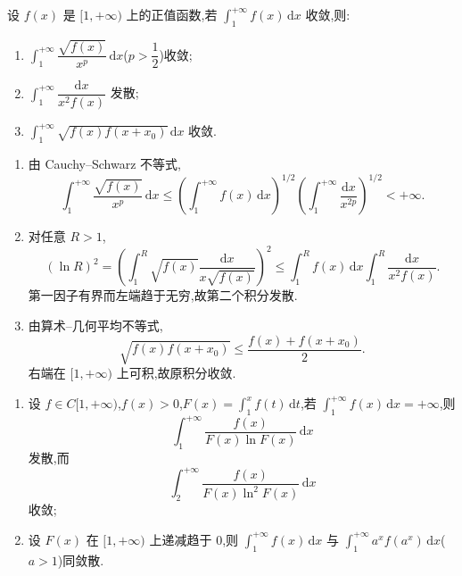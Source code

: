 \begin{example}
  设 $f(x)$ 是 $\lbrack 1,+\infty)$ 上的正值函数,若 $\displaystyle\int_1^{+\infty}f(x)\,\mathrm{d}x$ 收敛,则:
  \begin{enumerate}
    \item $\displaystyle\int_1^{+\infty}\dfrac{\sqrt{f(x)}}{x^p}\,\mathrm{d}x$($p>\dfrac{1}{2}$)收敛;
    \item $\displaystyle\int_1^{+\infty}\dfrac{\mathrm{d}x}{x^2f(x)}$ 发散;
    \item $\displaystyle\int_1^{+\infty}\sqrt{f(x)f(x+x_0)}\,\mathrm{d}x$ 收敛.
  \end{enumerate}
\end{example}
\exampleblank

\begin{solution}
  \leavevmode
  \begin{enumerate}
    \item 由 Cauchy--Schwarz 不等式,
          \[
            \displaystyle\int_1^{+\infty}\dfrac{\sqrt{f(x)}}{x^p}\,\mathrm{d}x
            \leq\left(\int_1^{+\infty}f(x)\,\mathrm{d}x\right)^{1/2}
            \left(\int_1^{+\infty}\dfrac{\mathrm{d}x}{x^{2p}}\right)^{1/2}<+\infty.
          \]
    \item 对任意 $R>1$,
          \[
            (\ln R)^2
            =\left(\int_1^R\sqrt{f(x)}\dfrac{\mathrm{d}x}{x\sqrt{f(x)}}\right)^2
            \leq\int_1^Rf(x)\,\mathrm{d}x
            \int_1^R\dfrac{\mathrm{d}x}{x^2f(x)}.
          \]
          第一因子有界而左端趋于无穷,故第二个积分发散.
    \item 由算术--几何平均不等式,
          \[
            \sqrt{f(x)f(x+x_0)}\leq\dfrac{f(x)+f(x+x_0)}{2}.
          \]
          右端在 $\lbrack1,+\infty)$ 上可积,故原积分收敛.
  \end{enumerate}
\end{solution}

\begin{example}
  \begin{enumerate}
    \item 设 $f\in C\lbrack 1,+\infty)$,$f(x)>0$,$\displaystyle F(x)=\int_1^xf(t)\,\mathrm{d}t$,若 $\displaystyle\int_1^{+\infty}f(x)\,\mathrm{d}x=+\infty$,则
          \[
            \displaystyle\int_1^{+\infty}\dfrac{f(x)}{F(x)\ln F(x)}\,\mathrm{d}x
          \]
          发散,而
          \[
            \displaystyle\int_2^{+\infty}\dfrac{f(x)}{F(x)\ln^2F(x)}\,\mathrm{d}x
          \]
          收敛;
    \item 设 $F(x)$ 在 $\lbrack 1,+\infty)$ 上递减趋于 $0$,则 $\displaystyle\int_1^{+\infty}f(x)\,\mathrm{d}x$ 与 $\displaystyle\int_1^{+\infty}a^xf(a^x)\,\mathrm{d}x$($a>1$)同敛散.
  \end{enumerate}
\end{example}
\exampleblank

